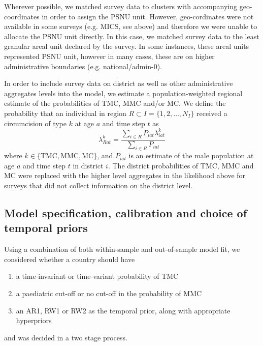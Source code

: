 \documentclass{article}
\begin{document}
\begin{appendix}
Wherever possible, we matched survey data to clusters with accompanying geo-coordinates in order to assign the PSNU unit. However, geo-cordinates were not available in some surveys (e.g. MICS, see above) and therefore we were unable to allocate the PSNU unit directly. In this case, we matched survey data to the least granular areal unit declared by the survey. In some instances, these areal units represented PSNU unit, however in many cases, these are on higher administrative boundaries (e.g. national/admin-0). 

In order to include survey data on district as well as other administrative aggregates levels into the model, we estimate a population-weighted regional estimate of the probabilities of TMC, MMC and/or MC. We define the probability that an individual in region $ R \subset I = \{1, 2, \ldots, N_I\}$ received a circumcision of type $k$ at age $a$ and time step $t$ as 
\begin{equation*}
	\lambda^{k}_{Rat} = \frac{\sum_{i\in R}P_{iat}\lambda^{k}_{iat}}{\sum_{i\in R}P_{iat}}
\end{equation*}
where $k\in \{\textrm{TMC}, \textrm{MMC}, \textrm{MC}\}$, and $P_{iat}$ is an estimate of the male population at age $a$ and time step $t$ in district $i$. The district probabilities of TMC, MMC and MC were replaced with the higher level aggregates in the likelihood above for surveys that did not collect information on the district level. 


\subsection{Model specification, calibration and choice of temporal priors}
\label{sec::modelcheck}


Using a combination of both within-sample and out-of-sample model fit, we considered whether a country should have
\begin{enumerate}
    \item a time-invariant or time-variant probability of TMC 
    \item a paediatric cut-off or no cut-off in the probability of MMC 
    \item an AR1, RW1 or RW2 as the temporal prior, along with appropriate hyperpriors
\end{enumerate}
and was decided in a two stage process. 


\end{appendix}
\end{document}

